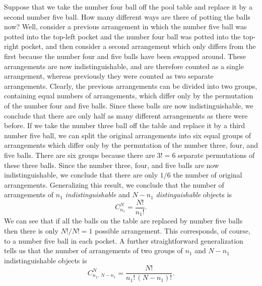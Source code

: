 Suppose that we take the number four  ball off the pool 
table and replace it
by a second number five ball. How many different ways are there of potting
the balls now? Well, consider a previous arrangement in which the number five
ball was potted into the top-left pocket and the number four ball was potted
into the top-right pocket, and then consider a second arrangement which only
differs from the first because the number four and five balls have been
swapped around.
 These arrangements are now
indistinguishable, and are therefore counted as a single arrangement, whereas
previously they were counted as two separate arrangements. Clearly, the 
previous arrangements can be divided into two groups, containing equal numbers
of arrangements, which differ only by the permutation of the
number four and five balls. Since these balls are now indistinguishable, we 
conclude that there are only half as many different arrangements as
there were before. If we take the number three ball off the table and replace 
it by a third number five ball, we can split the original arrangements into
six equal groups of arrangements which differ only by the permutation
of the number three, four, and five balls. There are six groups because there
are $3!=6$ separate permutations of these three balls. Since the number three,
four, and five balls are now indistinguishable, we conclude that there are 
only $1/6$ the number of original arrangements. Generalizing this result, we
conclude that the number of arrangements of $n_1$ {\em indistinguishable}\/ and
$N-n_1$ {\em distinguishable}\/ objects is
\begin{equation}
C_{n_1}^N = \frac{N!}{n_1 !}.
\end{equation}
We can see that if all the balls on the table are replaced by number
five balls then there is only $N!/N! = 1$ possible arrangement. This
corresponds, of course,  to a number five ball in each pocket.
A further straightforward generalization tells us that the
number of arrangements of two groups of $n_1$ and $N-n_1$ indistinguishable
objects is
\begin{equation}
C_{n_1,\,N-n_1}^N = \frac{N!}{n_1 ! \,(N-n_1)!}.\label{e2.18}
\end{equation}

